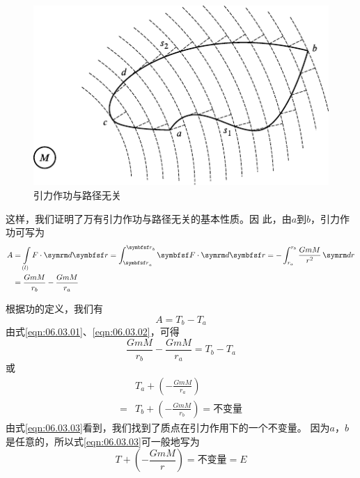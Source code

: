 \begin{figure}[h]
  \centering
  \includegraphics{figure/fig06.08}
  \caption{引力作功与路径无关}
  \label{fig:06.08}
  \vspace{-0.8em}
\end{figure}

这样，我们证明了万有引力作功与路径无关的基本性质。因
此，由$ a $到$ b $，引力作功可写为
\begin{equation}\label{eqn:06.03.01}
  \begin{aligned}
    A & = \int \limits _{(l)} F \cdot \dif \vec{r} = \int _ { \vec{r}_a } ^ { \vec{r}_b } \vec{F} \cdot \dif \vec{r} = - \int _ { r _ a } ^ { r _ b } \frac { G m M } { r ^ { 2 } } \dif r \\
      & = \frac { G m M } { r _ { b } } - \frac { G m M } { r _ { a } }
  \end{aligned}
\end{equation}

\clearpage
根据功的定义，我们有
\begin{equation}\label{eqn:06.03.02}
  A = T _ { b } - T _ { a }
\end{equation}
由式\eqref{eqn:06.03.01}、\eqref{eqn:06.03.02}，可得
\begin{equation*}
  \frac { G m M } { r _ { b } } - \frac { G m M } { r _ { a } } = T _ { b } - T _ { a }
\end{equation*}
或
\begin{equation}\label{eqn:06.03.03}
  \begin{aligned}
      & T _ { a } + \left( - \frac { G m M } { r _ { a } } \right)              \\
    = & T _ { b } + \left( - \frac { G m M } { r _ { b } } \right) = \text{不变量}
  \end{aligned}
\end{equation}
由式\eqref{eqn:06.03.03}看到，我们找到了质点在引力作用下的一个不变量。
因为$ a $，$ b $是任意的，所以式\eqref{eqn:06.03.03}可一般地写为
\begin{equation}\label{eqn:06.03.04}
  T + \left( - \frac { G m M } { r } \right) = \text{不变量} = E
\end{equation}

